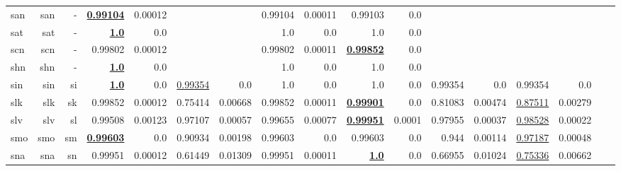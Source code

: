 \documentclass[11pt]{article}
\begin{document}
\begin{table*}[h]
{\begin{tabular}{lrrrrrrrrrrrrrrrr}
san         & san         & -         & \textbf{\underline{0.99104}}         & 0.00012         &          &          & 0.99104         & 0.00011         & 0.99103         & 0.0         &          &          &          &          \\
sat         & sat         & -         & \textbf{\underline{1.0}}         & 0.0         &          &          & 1.0         & 0.0         & 1.0         & 0.0         &          &          &          &          \\
scn         & scn         & -         & 0.99802         & 0.00012         &          &          & 0.99802         & 0.00011         & \textbf{\underline{0.99852}}         & 0.0         &          &          &          &          \\
shn         & shn         & -         & \textbf{\underline{1.0}}         & 0.0         &          &          & 1.0         & 0.0         & 1.0         & 0.0         &          &          &          &          \\
sin         & sin         & si         & \textbf{\underline{1.0}}         & 0.0         & \underline{0.99354}         & 0.0         & 1.0         & 0.0         & 1.0         & 0.0         & 0.99354         & 0.0         & 0.99354         & 0.0         \\
slk         & slk         & sk         & 0.99852         & 0.00012         & 0.75414         & 0.00668         & 0.99852         & 0.00011         & \textbf{\underline{0.99901}}         & 0.0         & 0.81083         & 0.00474         & \underline{0.87511}         & 0.00279         \\
slv         & slv         & sl         & 0.99508         & 0.00123         & 0.97107         & 0.00057         & 0.99655         & 0.00077         & \textbf{\underline{0.99951}}         & 0.0001         & 0.97955         & 0.00037         & \underline{0.98528}         & 0.00022         \\
smo         & smo         & sm         & \textbf{\underline{0.99603}}         & 0.0         & 0.90934         & 0.00198         & 0.99603         & 0.0         & 0.99603         & 0.0         & 0.944         & 0.00114         & \underline{0.97187}         & 0.00048         \\
sna         & sna         & sn         & 0.99951         & 0.00012         & 0.61449         & 0.01309         & 0.99951         & 0.00011         & \textbf{\underline{1.0}}         & 0.0         & 0.66955         & 0.01024         & \underline{0.75336}         & 0.00662         \\

\end{tabular}}
\end{table*}
\end{document}

